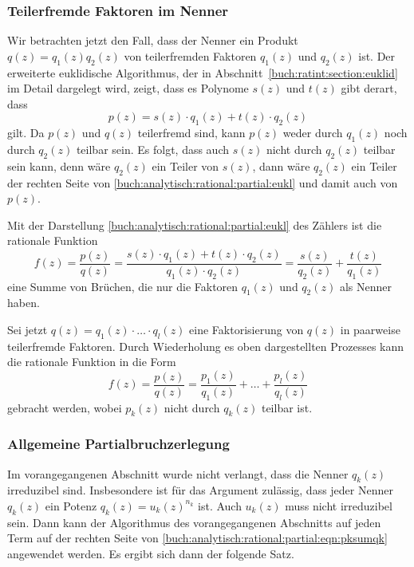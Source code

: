 \subsubsection{Teilerfremde Faktoren im Nenner}
Wir betrachten jetzt den Fall, dass der Nenner ein Produkt
$q(z) = q_1(z)q_2(z)$ von teilerfremden Faktoren $q_1(z)$ und $q_2(z)$
ist.
Der erweiterte euklidische Algorithmus, der in
Abschnitt~\ref{buch:ratint:section:euklid} im Detail dargelegt wird,
zeigt, dass es Polynome
%
$s(z)$ und $t(z)$ gibt derart, dass
\begin{equation}
p(z)
=
s(z)\cdot q_1(z) + t(z)\cdot q_2(z)
\label{buch:analytisch:rational:partial:eukl}
\end{equation}
gilt.
Da $p(z)$ und $q(z)$ teilerfremd sind, kann $p(z)$ weder durch
$q_1(z)$ noch durch $q_2(z)$ teilbar sein.
Es folgt, dass auch
$s(z)$ nicht durch $q_2(z)$ teilbar sein kann, denn wäre $q_2(z)$
ein Teiler von $s(z)$, dann wäre $q_2(z)$ ein Teiler der rechten
Seite von
\eqref{buch:analytisch:rational:partial:eukl}
und damit auch von $p(z)$.

Mit der Darstellung
\eqref{buch:analytisch:rational:partial:eukl}
des Zählers ist die rationale Funktion
\[
f(z)
=
\frac{p(z)}{q(z)}
=
\frac{
s(z)\cdot q_1(z) + t(z)\cdot q_2(z)
}{q_1(z)\cdot q_2(z)}
=
\frac{s(z)}{q_2(z)}
+
\frac{t(z)}{q_1(z)}
\]
eine Summe von Brüchen, die nur die Faktoren $q_1(z)$ und $q_2(z)$
als Nenner haben.

Sei jetzt $q(z)=q_1(z)\cdot \ldots \cdot q_l(z)$ eine Faktorisierung
von $q(z)$ in paarweise teilerfremde Faktoren.
Durch Wiederholung es oben dargestellten Prozesses kann die rationale
Funktion in die Form
\begin{equation}
f(z)
=
\frac{p(z)}{q(z)}
=
\frac{p_1(z)}{q_1(z)}
+
\ldots
+
\frac{p_l(z)}{q_l(z)}
\label{buch:analytisch:rational:partial:eqn:pksumqk}
\end{equation}
gebracht werden, wobei $p_k(z)$ nicht durch $q_k(z)$ teilbar ist.

%
%
\subsubsection{Allgemeine Partialbruchzerlegung}
Im vorangegangenen Abschnitt wurde nicht verlangt, dass die Nenner
$q_k(z)$ irreduzibel sind.
Insbesondere ist für das Argument zulässig, dass jeder Nenner $q_k(z)$
ein Potenz $q_k(z) = u_k(z)^{n_k}$ ist.
Auch $u_k(z)$ muss nicht irreduzibel sein.
Dann kann der Algorithmus des vorangegangenen Abschnitts auf jeden
Term auf der rechten Seite von
\eqref{buch:analytisch:rational:partial:eqn:pksumqk}
angewendet werden.
Es ergibt sich dann der folgende Satz.


